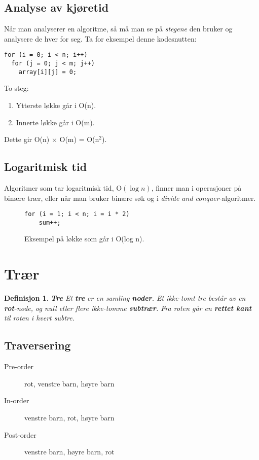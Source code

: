\documentclass[11pt,a4paper]{article}
\theoremstyle{def}
\newtheorem{definition}[subsection]{Definisjon}
\begin{document}
\newpage

\subsection{Analyse av kjøretid}
Når man analyserer en algoritme, så må man se på \textit{stegene} den bruker og analysere de hver for seg. Ta for eksempel denne kodesnutten:
\begin{Verbatim}[frame=single]
for (i = 0; i < n; i++)
  for (j = 0; j < m; j++)
    array[i][j] = 0;
\end{Verbatim}

\noindent To steg:\vspace{-15pt}
\begin{enumerate}
\item
Ytterste løkke går i O(n).
\item
Innerte løkke går i O(m).
\end{enumerate}
\vspace{-15pt}
Dette gir O(n) $\times$ O(m) = O(n$^2$).

\subsection{Logaritmisk tid}
Algoritmer som tar logaritmisk tid, O$(\log n)$, finner man i operasjoner på binære trær, eller når man bruker binære søk og i \textit{divide and conquer}-algoritmer. 

\begin{figure}[h!]
\begin{Verbatim}[frame=single]
for (i = 1; i < n; i = i * 2)
    sum++;
\end{Verbatim}
\vspace{-15pt}
\caption{Eksempel på løkke som går i O(log n).}
\end{figure}

\newpage

\section{Trær}

\begin{definition}
\emph{\textbf{Tre}}
Et \textbf{tre} er en samling \textbf{noder}. Et ikke-tomt tre består av en \textbf{rot}-node, og null eller flere ikke-tomme \textbf{subtrær}. Fra roten går en \textbf{rettet kant} til roten i hvert subtre.
\end{definition}

\subsection{Traversering}
\begin{description}
\item[Pre-order] rot, venstre barn, høyre barn
\item[In-order] venstre barn, rot, høyre barn
\item[Post-order] venstre barn, høyre barn, rot
\end{description}
\end{document}
